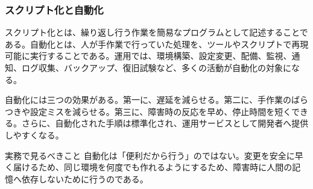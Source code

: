 \subsubsection{スクリプト化と自動化}

スクリプト化とは、繰り返し行う作業を簡易なプログラムとして記述することである。自動化とは、人が手作業で行っていた処理を、ツールやスクリプトで再現可能に実行することである。運用では、環境構築、設定変更、配備、監視、通知、ログ収集、バックアップ、復旧試験など、多くの活動が自動化の対象になる。

自動化には三つの効果がある。第一に、遅延を減らせる。第二に、手作業のばらつきや設定ミスを減らせる。第三に、障害時の反応を早め、停止時間を短くできる。さらに、自動化された手順は標準化され、運用サービスとして開発者へ提供しやすくなる。

\begin{pointbox}{実務で見るべきこと}
自動化は「便利だから行う」のではない。変更を安全に早く届けるため、同じ環境を何度でも作れるようにするため、障害時に人間の記憶へ依存しないために行うのである。
\end{pointbox}
